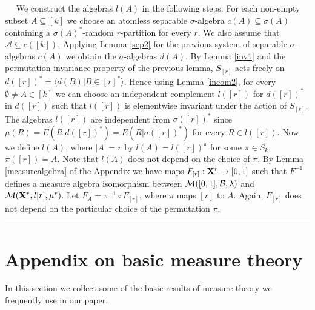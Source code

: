 \documentclass [11pt] {article}
\newcommand{\qed} {\hspace {0.1in} \rule {1.5mm} {3.5mm}}
\def\cB{\mbox{$\cal B$}}
\def\cB{\mbox{$\cal B$}}
\def\cM{\mbox{$\cal M$}}
\def\to{\rightarrow}
\def\xo{{\bf X}}
\begin{document}
\medskip
{}~~ We construct the
algebras $l(A)$ in the following steps. For each non-empty subset
$A\subseteq[k]$ we choose an atomless separable $\sigma$-algebra
$c(A)\subseteq\sigma(A)$ containing a $\sigma(A)^*$-random
$r$-partition for every $r$. We also assume
that $\mathcal{A}\subseteq c([k])$. Applying
Lemma \ref{sep2} for the previous
system of separable
  $\sigma$-algebras $c(A)$ we obtain the $\sigma$-algebras $d(A)$.
By Lemma \ref{inv1} and the permutation invariance property of the
previous lemma, $S_{[r]}$ acts freely on
  $d([r])^*=\langle d(B)|B\in
  [r]^*\rangle$. Hence
using Lemma \ref{incom2}, for every $\emptyset\neq A\in[k]$ we can choose an
independent
 complement $l([r])$ for $d([r])^*$ in $d([r])$ such
that $l([r])$ is elementwise invariant under the
  action of $S_{[r]}$.  The algebras $l([r])$ are independent from
$\sigma([r])^*$
since $\mu(R)=E(R|d([r])^*)=E(R|\sigma([r])^*)$ for every $R\in l([r])$.
Now we define $l(A)$, where $|A|=r$ by $l(A)=l([r])^\pi$ for some
$\pi \in S_k$, $\pi([r])=A$. Note that $l(A)$ does not depend on the choice
of $\pi$. By Lemma \ref{measurealgebra} of the Appendix we have
maps $F_{[r]}:\xo^r\to [0,1]$ such that $F^{-1}$ defines a measure
algebra isomorphism between $\cM([0,1],\cB,\lambda)$ and
$\cM(\xo^r,l[r],\mu^r)$.
Let $F_A=\pi^{-1}\circ F_{[r]}$, where $\pi$ maps $[r]$ to $A$. Again,
$F_{[r]}$ does not depend on the particular choice of the
permutation $\pi$. \qed





\section{Appendix on basic measure theory}
In this section we collect some of the basic results of measure theory
we frequently use in our paper.
\end{document}
